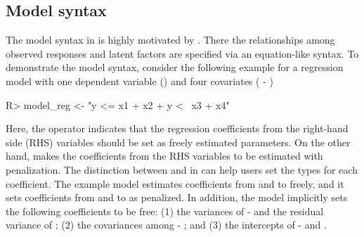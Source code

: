 \documentclass[nojss]{jss}
\begin{document}
\subsection{Model syntax} \label{sec:lslx_syntax}
The model syntax in  is highly motivated by  \citep{Rosseel2012}. There the relationships among observed responses and latent factors are specified via an equation-like syntax. To demonstrate the model syntax, consider the following example for a regression model with one dependent variable () and four covariates ( - )
\begin{Schunk}
\begin{Sinput}
R> model_reg <- "y <= x1 + x2
+                y <~ x3 + x4"
\end{Sinput}
\end{Schunk}
Here, the operator \code{<=} indicates that the regression coefficients from the right-hand side (RHS) variables should be set as freely estimated parameters. On the other hand, \code{<~} makes the coefficients from the RHS variables to be estimated with penalization. The distinction between \code{<=} and \code{<~} in  can help users set the types for each coefficient. The example model estimates coefficients from  and  to  freely, and it sets coefficients from  and  to  as penalized. In addition, the model implicitly sets the following coefficients to be free: (1) the variances of  -  and the residual variance of ; (2) the covariances among  - ; and (3) the intercepts of  -  and .
\end{document}
